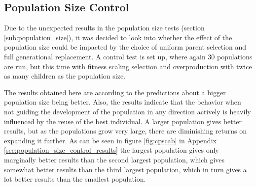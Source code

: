 \subsection{Population Size Control} %
\label{sub:population_size_control}

Due to the unexpected results in the population size tests (section \ref{sub:population_size}), it was decided to look into whether the effect of the population size could be impacted by the choice of uniform parent selection and full generational replacement. A control test is set up, where again 30 populations are run, but this time with fitness scaling selection and overproduction with twice as many children as the population size.

The results obtained here are according to the predictions about a bigger population size being better. Also, the results indicate that the behavior when not guiding the development of the population in any direction actively is heavily influenced by the reuse of the best individual. A larger population gives better results, but as the populations grow very large, there are diminishing returns on expanding it further. As can be seen in figure \ref{fig:cpscab} in Appendix \ref{sec:population_size_control_results} the largest population gives only marginally better results than the second largest population, which gives somewhat better results than the third largest population, which in turn gives a lot better results than the smallest population.




